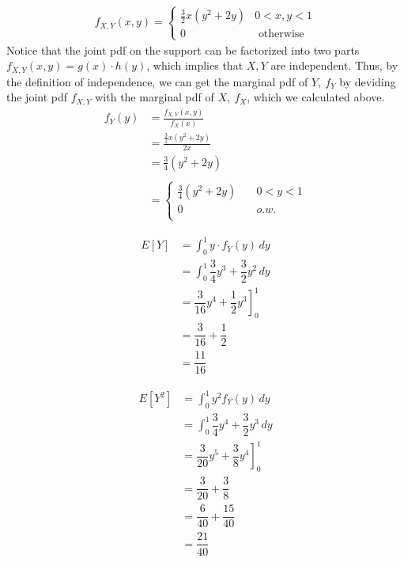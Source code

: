 \documentclass[11pt]{article}
\begin{document}
    \begin{align*}
        f_{X,Y}(x, y) = \left\{ \begin{array}{cc} \frac{3}{2}x(y^2 + 2y) & 0 < x, y < 1 \\ 0 & \textrm{ otherwise} \end{array} \right.
    \end{align*}
    Notice that the joint pdf on the support can be factorized into two parts
    $f_{X,Y}(x, y) = g(x) \cdot h(y)$, which implies that $X, Y$ are
    independent. Thus, by the definition of independence, we can get the marginal
    pdf of $Y,\ f_Y$ by deviding the joint pdf $f_{X,Y}$ with the marginal pdf
    of $X,\ f_X$, which we calculated above.
    \begin{align*}
        f_Y(y) &= \frac{f_{X, Y}(x, y)}{f_X(x)} \\ 
        &= \frac{\frac{3}{2}x(y^2 + 2y)}{2x} \\
        &= \frac{3}{4}(y^2 + 2y) \\ \\ 
        &= \begin{cases}
            \frac{3}{4}(y^2 + 2y) \quad & 0 < y < 1\\
            0 \quad & o.w.\\
        \end{cases}
    \end{align*}

    \begin{align*}
        E[Y] &= \int _{0}^{1} y \cdot f_{Y}(y)\,dy \\
            &= \int _{0}^{1}\dfrac{3}{4}y^{3}+\dfrac{3}{2}y^{2}\,dy \\
            &= \left. \dfrac{3}{16}y^{4}+\dfrac{1}{2}y^{3}\right]^1_0 \\
            &= \dfrac{3}{16}+\dfrac{1}{2} \\
            &= \dfrac{11}{16}
    \end{align*}
    
    \begin{align*}
        E\left[ Y^{2}\right] &= \int _{0}^{1}y^{2}f_{Y}\left( y\right)\,dy \\ 
        &= \int _{0}^{1}\dfrac{3}{4}y^{4}+\dfrac{3}{2}y^{3}\,dy \\
        &= \left.\dfrac{3}{20}y^{5}+\dfrac{3}{8}y^{4}\right]_{0}^{1} \\ 
        &= \dfrac{3}{20}+\dfrac{3}{8} \\ 
        &= \dfrac{6}{40}+\dfrac{15}{40} \\ 
        &= \dfrac{21}{40}
    \end{align*}
\end{document}
